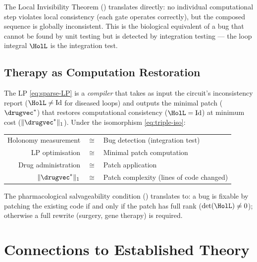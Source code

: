 The Local Invisibility Theorem () translates directly:
no individual computational step violates local consistency (each gate operates
correctly), but the composed sequence is globally inconsistent.  This is the
biological equivalent of a bug that cannot be found by unit testing but is
detected by integration testing — the loop integral $\HolL$ is the integration
test.

\subsection{Therapy as Computation Restoration}

The LP \eqref{eq:sparse-LP} is a \emph{compiler} that takes as input the
circuit's inconsistency report ($\HolL \neq \mathrm{Id}$ for diseased loops)
and outputs the minimal patch ($\drugvec^*$) that restores computational
consistency ($\HolL = \mathrm{Id}$) at minimum cost ($\|\drugvec^*\|_1$).
Under the isomorphism \eqref{eq:triple-iso}:

\begin{center}
\begin{tabular}{rcl}
  Holonomy measurement & $\cong$ & Bug detection (integration test) \\
  LP optimisation       & $\cong$ & Minimal patch computation \\
  Drug administration   & $\cong$ & Patch application \\
  $\|\drugvec^*\|_1$    & $\cong$ & Patch complexity (lines of code changed) \\
\end{tabular}
\end{center}

The pharmacological salvageability condition ()
translates to: a bug is fixable by patching the existing code if and only if
the patch has full rank ($\det(\HolL) \neq 0$); otherwise a full rewrite
(surgery, gene therapy) is required.

\section{Connections to Established Theory}
\label{sec:connections}

